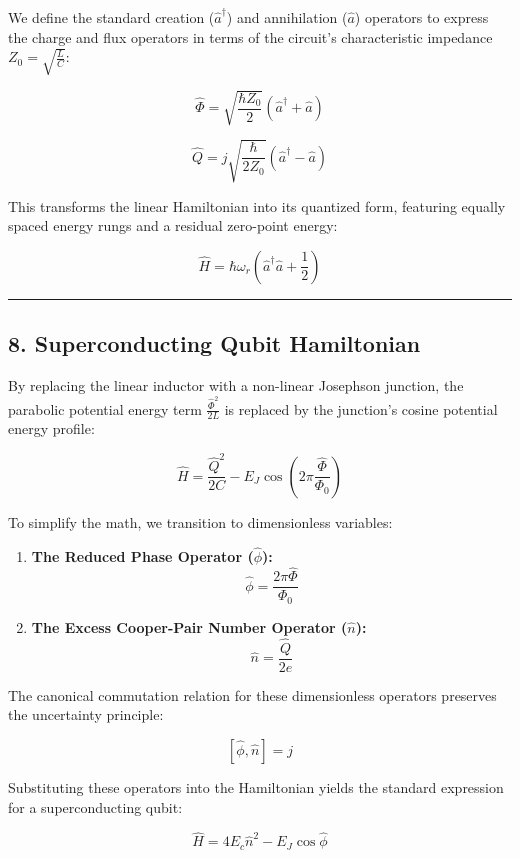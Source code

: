\documentclass[
]{article}
\begin{document}
We define the standard creation (\(\hat{a}^\dagger\)) and annihilation
(\(\hat{a}\)) operators to express the charge and flux operators in
terms of the circuit's characteristic impedance
\(Z_0 = \sqrt{\frac{L}{C}}\):

\[\hat{\Phi} = \sqrt{\frac{\hbar Z_0}{2}}(\hat{a}^\dagger + \hat{a})\]

$$\hat{Q} = j\sqrt{\frac{\hbar}{2 Z_0}}(\hat{a}^\dagger - \hat{a})$$

This transforms the linear Hamiltonian into its quantized form,
featuring equally spaced energy rungs and a residual zero-point energy:

\[\hat{H} = \hbar \omega_r \left(\hat{a}^\dagger \hat{a} + \frac{1}{2}\right)\]

\begin{center}\rule{0.5\linewidth}{0.5pt}\end{center}

\subsection{8. Superconducting Qubit
Hamiltonian}\label{superconducting-qubit-hamiltonian}

By replacing the linear inductor with a non-linear Josephson junction,
the parabolic potential energy term \(\frac{\hat{\Phi}^2}{2L}\) is
replaced by the junction's cosine potential energy profile:

\[\hat{H} = \frac{\hat{Q}^2}{2C} - E_J \cos\left(2\pi \frac{\hat{\Phi}}{\Phi_0}\right)\]

To simplify the math, we transition to dimensionless variables:

\begin{enumerate}
\def\labelenumi{\arabic{enumi}.}
\item
  \textbf{The Reduced Phase Operator (\(\hat{\phi}\)):}
  \[\hat{\phi} = \frac{2\pi \hat{\Phi}}{\Phi_0}\]
\item
  \textbf{The Excess Cooper-Pair Number Operator (\(\hat{n}\)):}
  \[\hat{n} = \frac{\hat{Q}}{2e}\]
\end{enumerate}

The canonical commutation relation for these dimensionless operators
preserves the uncertainty principle:

\[[\hat{\phi}, \hat{n}] = j\]

Substituting these operators into the Hamiltonian yields the standard
expression for a superconducting qubit:

\[\hat{H} = 4 E_c \hat{n}^2 - E_J \cos \hat{\phi}\]
\end{document}
